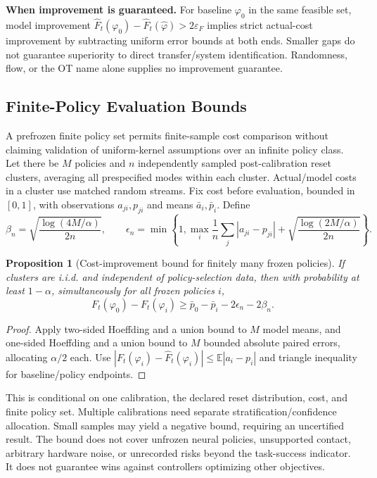 \documentclass[11pt]{article}
\newtheorem{proposition}{Proposition}[section]
\begin{document}
\textbf{When improvement is guaranteed.} For baseline $\varphi_0$ in the same feasible
set, model improvement
$\widehat F_t(\varphi_0)-\widehat F_t(\hat\varphi)>2\varepsilon_F$
implies strict actual-cost improvement by subtracting uniform error bounds at both
ends. Smaller gaps do not guarantee superiority to direct transfer/system identification.
Randomness, flow, or the OT name alone supplies no improvement guarantee.



\subsection{Finite-Policy Evaluation Bounds}
A prefrozen finite policy set permits finite-sample cost comparison without claiming
validation of uniform-kernel assumptions over an infinite policy class. Let there
be $M$ policies and $n$ independently sampled post-calibration reset clusters, averaging
all prespecified modes within each cluster. Actual/model costs in a cluster use matched
random streams. Fix cost before evaluation, bounded in $[0,1]$, with observations
$a_{ji},p_{ji}$ and means $\bar a_i,\bar p_i$. Define
\[
 \beta_n=\sqrt{\frac{\log(4M/\alpha)}{2n}},\qquad
 \epsilon_n=\min\!\left\{1,\max_i\frac1n\sum_j|a_{ji}-p_{ji}|+
 \sqrt{\frac{\log(2M/\alpha)}{2n}}\right\}.
\]
\begin{proposition}[Cost-improvement bound for finitely many frozen policies]
If clusters are i.i.d. and independent of policy-selection data, then with probability
at least $1-\alpha$, simultaneously for all frozen policies $i$,
\[
 F_t(\varphi_0)-F_t(\varphi_i)
 \ge\bar p_0-\bar p_i-2\epsilon_n-2\beta_n.
\]
\end{proposition}
\begin{proof}
Apply two-sided Hoeffding and a union bound to $M$ model means, and one-sided Hoeffding
and a union bound to $M$ bounded absolute paired errors, allocating $\alpha/2$ each.
Use $|F_t(\varphi_i)-\widehat F_t(\varphi_i)|\le\mathbb E|a_i-p_i|$ and triangle
inequality for baseline/policy endpoints.
\end{proof}
This is conditional on one calibration, the declared reset distribution, cost, and
finite policy set. Multiple calibrations need separate stratification/confidence
allocation. Small samples may yield a negative bound, requiring an uncertified result.
The bound does not cover unfrozen neural policies, unsupported contact, arbitrary
hardware noise, or unrecorded risks beyond the task-success indicator. It does not
guarantee wins against controllers optimizing other objectives.
\end{document}
